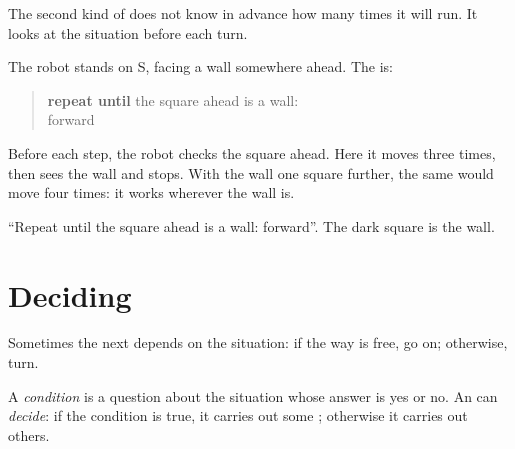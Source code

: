 The second kind of  does not know in advance how many times it will run. It
looks at the situation before each turn.

\begin{example}\label{ex:g4:algorithms-repeat-and-decide:until}
The robot stands on S, facing a wall somewhere ahead. The  is:
\begin{quote}
\textbf{repeat until} the square ahead is a wall:\\
\hspace*{1.5em}forward
\end{quote}
Before each step, the robot checks the square ahead. Here it moves three times,
then sees the wall and stops. With the wall one square further, the same
 would move four times: it works wherever the wall is.
\end{example}

\begin{omfigure}

{\small ``Repeat until the square ahead is a wall: forward''. The dark square
is the wall.}
\label{fig:g4:algorithms-repeat-and-decide:until}
\end{omfigure}

\section{Deciding}

Sometimes the next  depends on the situation: if the way is free,
go on; otherwise, turn.

\begin{definition}[Condition]\label{def:g4:algorithms-repeat-and-decide:condition}
A \emph{condition} is a question about the situation whose
answer is yes or no. An  can \emph{decide}: if the condition is true,
it carries out some ; otherwise it carries out others.
\end{definition}

